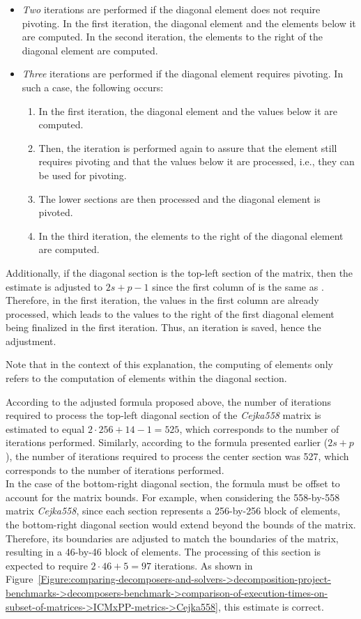 \begin{itemize}
	\itemsep=0em %
	\item \textit{Two} iterations are performed if the diagonal element does not require pivoting. In the first iteration, the diagonal element and the elements below it are computed. In the second iteration, the elements to the right of the diagonal element are computed.
	\item \textit{Three} iterations are performed if the diagonal element requires pivoting. In such a case, the following occurs:
	\begin{enumerate}
		\item In the first iteration, the diagonal element and the values below it are computed.
		\item Then, the iteration is performed again to assure that the element still requires pivoting and that the values below it are processed, i.e., they can be used for pivoting.
		\item The lower sections are then processed and the diagonal element is pivoted.
		\item In the third iteration, the elements to the right of the diagonal element are computed.
	\end{enumerate}
\end{itemize}

Additionally, if the diagonal section is the top-left section of the matrix, then the estimate is adjusted to $2s + p - 1$ since the first column of  is the same as . Therefore, in the first iteration, the values in the first column are already processed, which leads to the values to the right of the first diagonal element being finalized in the first iteration. Thus, an iteration is saved, hence the adjustment.

Note that in the context of this explanation, the computing of elements only refers to the computation of elements within the diagonal section.

According to the adjusted formula proposed above, the number of iterations required to process the top-left diagonal section of the \textit{Cejka558} matrix is estimated to equal $2\cdot 256 + 14 - 1 = 525$, which corresponds to the number of iterations performed. Similarly, according to the formula presented earlier ($2s + p$), the number of iterations required to process the center section was 527, which corresponds to the number of iterations performed.\\
In the case of the bottom-right diagonal section, the formula must be offset to account for the matrix bounds. For example, when considering the 558-by-558 matrix \textit{Cejka558}, since each section represents a 256-by-256 block of elements, the bottom-right diagonal section would extend beyond the bounds of the matrix. Therefore, its boundaries are adjusted to match the boundaries of the matrix, resulting in a 46-by-46 block of elements. The processing of this section is expected to require $2\cdot 46 + 5 = 97$ iterations. As shown in Figure~\ref{Figure:comparing-decomposers-and-solvers->decomposition-project-benchmarks->decomposers-benchmark->comparison-of-execution-times-on-subset-of-matrices->ICMxPP-metrics->Cejka558}, this estimate is correct.

